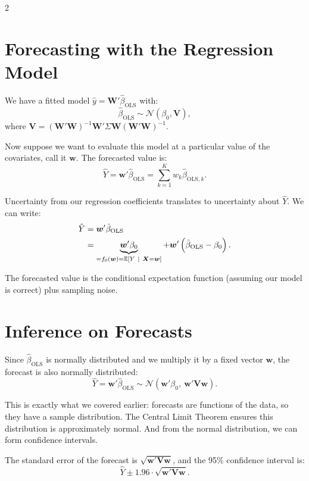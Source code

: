 \documentclass[12pt]{article}
\begin{document}
\begin{multicols}{2}
  \section*{Forecasting with the Regression Model}

  We have a fitted model $\hat{y} = \bm{W}' \hat{\beta}_{\text{OLS}}$ with:
  $$
  \hat{\beta}_{\text{OLS}} \sim \mathcal{N}\left( \beta_0, \bm{V} \right),
  $$
  where $\bm{V} = \left(\bm{W}' \bm{W} \right)^{-1} \bm{W}' \Sigma \bm{W} \left(\bm{W}' \bm{W} \right)^{-1}$.

  Now suppose we want to evaluate this model at a particular value of the covariates, call it $\bm{w}$. The forecasted value is:
  $$
  \hat{Y} = \bm{w}' \hat{\beta}_{\text{OLS}} = \sum_{k=1}^K w_k \hat{\beta}_{\text{OLS}, k}.
  $$

  Uncertainty from our regression coefficients translates to uncertainty about $\hat{Y}$. We can write:
  \begin{align*}
    \hat{Y} & = \bm{w}' \hat{\beta}_{\text{OLS}}                                                                                                       \\
    & = \underbrace{\bm{w}' \beta_0}_{= f_0(\bm{w}) = \expec{Y}{\bm{X} = \bm{w}}} + \bm{w}' \left( \hat{\beta}_{\text{OLS}} - \beta_0 \right).
  \end{align*}

  The forecasted value is the conditional expectation function (assuming our model is correct) plus sampling noise.

  \section*{Inference on Forecasts}

  Since $\hat{\beta}_{\text{OLS}}$ is normally distributed and we multiply it by a fixed vector $\bm{w}$, the forecast is also normally distributed:
  $$
  \hat{Y} = \bm{w}' \hat{\beta}_{\text{OLS}} \sim \mathcal{N}\left( \bm{w}' \beta_0, \ \bm{w}' \bm{V} \bm{w} \right).
  $$

  This is exactly what we covered earlier: forecasts are functions of the data, so they have a sample distribution.
  The Central Limit Theorem ensures this distribution is approximately normal.
  And from the normal distribution, we can form confidence intervals.

  The standard error of the forecast is $\sqrt{\bm{w}' \bm{V} \bm{w}}$, and the 95\% confidence interval is:
  $$
  \hat{Y} \pm 1.96 \cdot \sqrt{\bm{w}' \bm{V} \bm{w}}.
  $$


\end{multicols}
\end{document}
